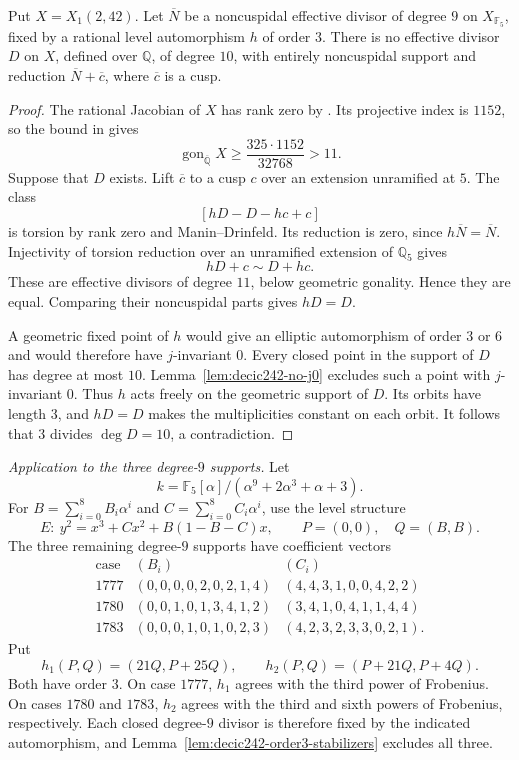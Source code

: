 \begin{lemma}\label{lem:decic242-order3-stabilizers}
Put $X=X_1(2,42)$. Let $\overline N$ be a noncuspidal effective
divisor of degree $9$ on $X_{\mathbb F_5}$, fixed by a rational
level automorphism $h$ of order $3$.
There is no effective divisor $D$ on $X$, defined over $\mathbb Q$,
of degree $10$, with entirely noncuspidal support and reduction
$\overline N+\overline c$, where $\overline c$ is a cusp.
\end{lemma}
\begin{proof}
The rational Jacobian of $X$ has rank zero by
\cite[Theorem~3.1]{DEHMZ}.
Its projective index is $1152$, so the bound in
\cite[(2.1)]{NV} gives
\[
 \operatorname{gon}_{\overline{\mathbb Q}}X
 \geq\frac{325\cdot1152}{32768}>11.
\]
Suppose that $D$ exists. Lift $\overline c$ to a cusp $c$ over
an extension unramified at $5$.
The class
\[
 [hD-D-hc+c]
\]
is torsion by rank zero and Manin--Drinfeld. Its reduction is
zero, since $h\overline N=\overline N$.
Injectivity of torsion reduction over an unramified extension of
$\mathbb Q_5$ gives
\[
 hD+c\sim D+hc.
\]
These are effective divisors of degree $11$, below geometric
gonality. Hence they are equal.
Comparing their noncuspidal parts gives $hD=D$.

A geometric fixed point of $h$ would give an elliptic
automorphism of order $3$ or $6$ and would therefore have
$j$-invariant $0$.
Every closed point in the support of $D$ has degree at most $10$.
Lemma~\ref{lem:decic242-no-j0} excludes such a point with
$j$-invariant $0$. Thus $h$ acts freely on the geometric support
of $D$. Its orbits have length $3$, and $hD=D$ makes the
multiplicities constant on each orbit. It follows that $3$
divides $\deg D=10$, a contradiction.
\end{proof}

\noindent\emph{Application to the three degree-$9$ supports.}
Let
\[
 k=\mathbb F_5[\alpha]/(\alpha^9+2\alpha^3+\alpha+3).
\]
For $B=\sum_{i=0}^8B_i\alpha^i$ and
$C=\sum_{i=0}^8C_i\alpha^i$, use the level structure
\[
 E:\ y^2=x^3+Cx^2+B(1-B-C)x,
 \qquad P=(0,0),\quad Q=(B,B).
\]
The three remaining degree-$9$ supports have coefficient vectors
\[
\begin{array}{c|c|c}
\text{case}&(B_i)&(C_i)\\ \hline
1777&(0,0,0,0,2,0,2,1,4)&(4,4,3,1,0,0,4,2,2)\\
1780&(0,0,1,0,1,3,4,1,2)&(3,4,1,0,4,1,1,4,4)\\
1783&(0,0,0,1,0,1,0,2,3)&(4,2,3,2,3,3,0,2,1).
\end{array}
\]
Put
\[
 h_1(P,Q)=(21Q,P+25Q),\qquad
 h_2(P,Q)=(P+21Q,P+4Q).
\]
Both have order $3$. On case $1777$, $h_1$ agrees with the
third power of Frobenius. On cases $1780$ and $1783$, $h_2$
agrees with the third and sixth powers of Frobenius,
respectively. Each closed degree-$9$ divisor is therefore fixed
by the indicated automorphism, and
Lemma~\ref{lem:decic242-order3-stabilizers} excludes all three.

